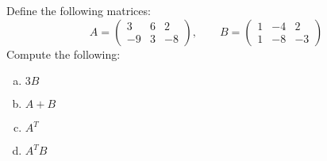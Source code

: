 \documentclass[11pt,letterpaper]{article}
\begin{document}
\newpage



 Define the following matrices:
	\[
	A= \begin{pmatrix} 3 & 6 & 2 \\ -9 & 3 & -8 \end{pmatrix}, \qquad B= \begin{pmatrix} 1 & -4 & 2 \\ 1 & -8 & -3 \end{pmatrix}
	\]
Compute the following:
	\begin{enumerate}[(a)]
	\item $3B$
	\item $A + B$
	\item $A^T$
	\item $A^TB$
	\end{enumerate} \pspace
\end{document}
